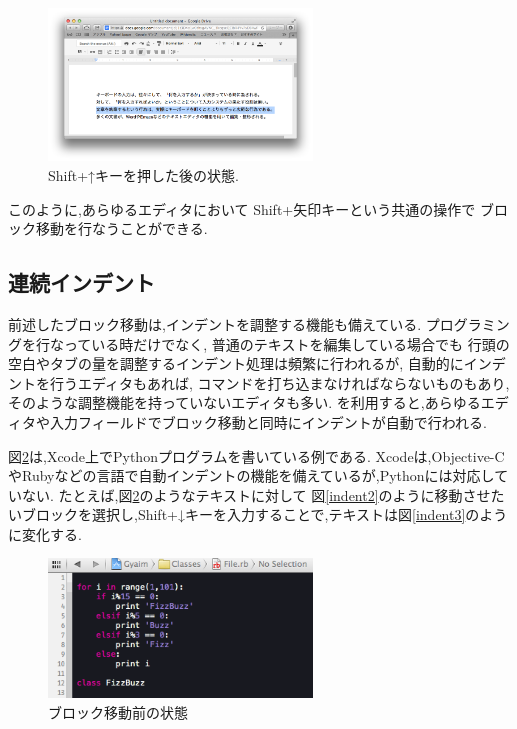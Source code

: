 \begin{figure}[H]
\centerline{\includegraphics[width=70mm,bb=0 0 935 542]{figures/block5.png}}
\caption{Shift+↑キーを押した後の状態.}
\label{move4}
\end{figure}

このように,あらゆるエディタにおいて
Shift+矢印キーという共通の操作で
ブロック移動を行なうことができる.

\subsection{連続インデント}

前述したブロック移動は,インデントを調整する機能も備えている.
プログラミングを行なっている時だけでなく,
普通のテキストを編集している場合でも
行頭の空白やタブの量を調整するインデント処理は頻繁に行われるが,
自動的にインデントを行うエディタもあれば,
コマンドを打ち込まなければならないものもあり,
そのような調整機能を持っていないエディタも多い.
{\system}を利用すると,あらゆるエディタや入力フィールドでブロック移動と同時にインデントが自動で行われる.

図\ref{indent1}は,Xcode上でPythonプログラムを書いている例である.
Xcodeは,Objective-CやRubyなどの言語で自動インデントの機能を備えているが,Pythonには対応していない.
たとえば,図\ref{indent1}のようなテキストに対して
図\ref{indent2}のように移動させたいブロックを選択し,Shift+↓キーを入力することで,テキストは図\ref{indent3}のように変化する.

\begin{figure}[H]
\centerline{\includegraphics[width=70mm,bb=0 0 360 190]{figures/indent1.png}}
\caption{ブロック移動前の状態}
\label{indent1}
\end{figure}

